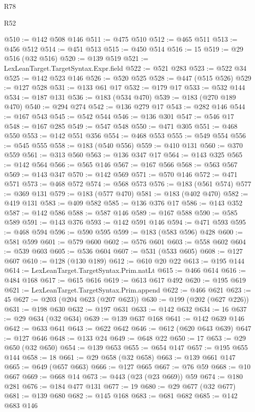 \begin{lexlean}{R78}
\begin{lexlean}{R52}
\begin{coremodule}
{{{{{{{{{{{{{{{{{{{{{{{{{{{{{{{{{{{{{{{{{{{{{{{{{{{{{{{{{{{{{{{{{{{{{{{{{{{{{{{{{{{{{{{{{{{{{{{{{{{{{{{{{{{{{{{{{{{{{{{{{{{{{{{{{{{{{{{{{{{{{{{{{{{{{{{{{{{{{{{{{{{{{{{{{{{{{{{{{{{{{{{{{{{{{{{{{{{{{{@510 := @142 @508 @146
@511 := @475 @510
@512 := @465 @511
@513 := @456 @512
@514 := @451 @513
@515 := @450 @514
@516 := 15
@519 := @29 @516 (@32 @516)
@520 := @139 @519
@521 := LexLeanTarget.TargetSyntax.Expr.field
@522 := @521 @283
@523 := @522 @34
@525 := @142 @523 @146
@526 := @520 @525
@528 := @447 (@515 @526)
@529 := @127 @528
@531 := @133 @61 @17
@532 := @179 @17
@533 := @532 @144
@534 := @187 @131
@536 := @183 (@534 @470)
@539 := @183 (@270 @189 @470)
@540 := @294 @274
@542 := @136 @279 @17
@543 := @282 @146
@544 := @167 @543
@545 := @542 @544
@546 := @136 @301
@547 := @546 @17
@548 := @167 @285
@549 := @547 @548
@550 := @471 @305
@551 := @468 @550
@553 := @142 @551 @356
@554 := @468 @553
@555 := @549 @554
@556 := @545 @555
@558 := @183 (@540 @556)
@559 := @410 @131
@560 := @370 @559
@561 := @313 @560
@563 := @136 @347 @17
@564 := @143 @325
@565 := @142 @564
@566 := @565 @146
@567 := @167 @566
@568 := @563 @567
@569 := @143 @347
@570 := @142 @569
@571 := @570 @146
@572 := @471 @571
@573 := @468 @572
@574 := @568 @573
@576 := @183 (@561 @574)
@577 := @369 @131
@579 := @183 (@577 @470)
@581 := @183 (@402 @470)
@582 := @419 @131
@583 := @409 @582
@585 := @136 @376 @17
@586 := @143 @352
@587 := @142 @586
@588 := @587 @146
@589 := @167 @588
@590 := @585 @589
@591 := @143 @376
@593 := @142 @591 @146
@594 := @471 @593
@595 := @468 @594
@596 := @590 @595
@599 := @183 (@583 @596) @428
@600 := @581 @599
@601 := @579 @600
@602 := @576 @601
@603 := @558 @602
@604 := @539 @603
@605 := @536 @604
@607 := @531 (@533 @605)
@608 := @127 @607
@610 := @128 (@130 @189)
@612 := @610 @20 @22
@613 := @195 @144
@614 := LexLeanTarget.TargetSyntax.Prim.natLt
@615 := @466 @614
@616 := @484 @168
@617 := @615 @616
@619 := @613 @617 @492
@620 := @195 @619
@621 := LexLeanTarget.TargetSyntax.Prim.append
@622 := @466 @621
@623 := 45
@627 := @203 (@204 @623 (@207 @623))
@630 := @199 (@202 (@627 @226))
@631 := @198 @630
@632 := @197 @631
@633 := @142 @632
@634 := 16
@637 := @29 @634 (@32 @634)
@639 := @139 @637 @168
@641 := @142 @639 @146
@642 := @633 @641
@643 := @622 @642
@646 := @612 (@620 @643 @639)
@647 := @127 @646
@648 := @133 @24
@649 := @648 @22
@650 := 17
@653 := @29 @650 (@32 @650)
@654 := @139 @653
@655 := @654 @147
@657 := @195 @655 @144
@658 := 18
@661 := @29 @658 (@32 @658)
@663 := @139 @661 @147
@665 := @649 (@657 @663)
@666 := @127 @665
@667 := @76 @59
@668 := @10 @667
@669 := @668 @14
@673 := @443 (@23 (@23 @669)) @59
@674 := @180 @281
@676 := @184 @477 @131
@677 := 19
@680 := @29 @677 (@32 @677)
@681 := @139 @680
@682 := @145 @168
@683 := @681 @682
@685 := @142 @683 @146
}}}}}}}}}}}}}}}}}}}}}}}}}}}}}}}}}}}}}}}}}}}}}}}}}}}}}}}}}}}}}}}}}}}}}}}}}}}}}}}}}}}}}}}}}}}}}}}}}}}}}}}}}}}}}}}}}}}}}}}}}}}}}}}}}}}}}}}}}}}}}}}}}}}}}}}}}}}}}}}}}}}}}}}}}}}}}}}}}}}}}}}}}}}}}}}}}}}}}}
\end{coremodule}
\end{lexlean}
\end{lexlean}
